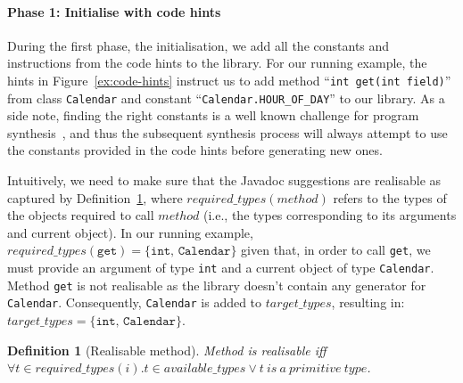 \documentclass[conference]{IEEEtran}
\newtheorem{definition}{Definition}
\newcommand{\availabletypes}{\mbox{$\mathit{available\_types}$}\xspace}
\newcommand{\targettypes}{\mbox{$\mathit{target\_types}$}\xspace}
\newcommand{\requiredtypes}{\mbox{$\mathit{required\_types}$}\xspace}
\begin{document}
\paragraph{{\bf Phase 1: Initialise with code hints}}
During the first phase, the initialisation, we add all the constants and instructions from the code hints to the library.
%
For our running example, the hints in Figure~\ref{ex:code-hints} %
instruct us to add method ``\lstinline[breaklines=true]{int get(int field)}'' from class
\lstinline[breaklines=true]{Calendar} and constant ``\lstinline[breaklines=true]{Calendar.HOUR_OF_DAY}'' to our library.
As a side note, finding the right constants is a well known
challenge for program synthesis~\cite{DBLP:conf/cav/AbateDKKP18}, and thus the subsequent
synthesis process will always attempt to use the constants provided in the code hints before generating new ones.

Intuitively, we need to make sure that the Javadoc suggestions
are realisable as captured by Definition~\ref{def:realizable}, where 
$\requiredtypes(\allowbreak method)$ refers to the types of the objects required to call $method$ (i.e., the types corresponding to its arguments and current object).
%
In our running example, $\requiredtypes(\texttt{get}) = \{\texttt{int, Calendar}\}$
given that, in order to call \lstinline[breaklines=true]{get}, we must
provide an argument of type \lstinline[breaklines=true]{int} and a current
object of type \lstinline[breaklines=true]{Calendar}.
Method \lstinline[breaklines=true]{get} is not realisable as the library
doesn't contain any generator for \lstinline[breaklines=true]{Calendar}. 
Consequently, \lstinline[breaklines=true]{Calendar} is added to
\targettypes, resulting in:
%
$\targettypes = \{\texttt{int, Calendar}\}$.

\begin{definition}[Realisable method]\label{def:realizable}
%
Method  is {\em realisable} iff $\forall t \in
\requiredtypes(i). t \in \availabletypes \vee t~is~a~\mathit{primitive}~\mathit{type}$.
%
\end{definition}
\end{document}
